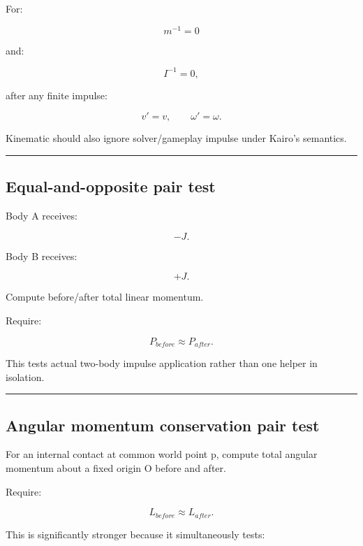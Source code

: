 For:

\[
m^{-1}=0
\]

and:

\[
I^{-1}=0,
\]

after any finite impulse:

\[
v'=v,
\qquad
\omega'=\omega.
\]

Kinematic should also ignore solver/gameplay impulse under Kairo's semantics.

\begin{center}\rule{0.5\linewidth}{0.5pt}\end{center}

\subsection{Equal-and-opposite pair test}\label{06-engine-ii-ch039-equal-and-opposite-pair-test}

\hypertarget{06-engine-ii-ch039-equal-and-opposite-pair-test}{}

Body A receives:

\[
-J.
\]

Body B receives:

\[
+J.
\]

Compute before/after total linear momentum.

Require:

\[
\boxed{
P_{before}\approx P_{after}.
}
\]

This tests actual two-body impulse application rather than one helper in isolation.

\begin{center}\rule{0.5\linewidth}{0.5pt}\end{center}

\subsection{Angular momentum conservation pair test}\label{06-engine-ii-ch039-angular-momentum-conservation-pair-test}

\hypertarget{06-engine-ii-ch039-angular-momentum-conservation-pair-test}{}

For an internal contact at common world point p, compute total angular momentum about a fixed origin O before and after.

Require:

\[
L_{before}\approx L_{after}.
\]

This is significantly stronger because it simultaneously tests:

